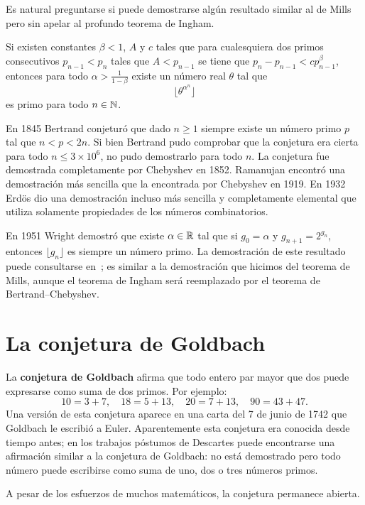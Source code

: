Es natural preguntarse si puede demostrarse algún resultado similar al de Mills
pero sin apelar al profundo teorema de Ingham. 

\begin{exercise}
	Si existen constantes $\beta<1$, $A$ y $c$ tales que para cualesquiera dos primos
	consecutivos $p_{n-1}<p_n$ tales que $A<p_{n-1}$ se tiene que
	$p_n-p_{n-1}<cp_{n-1}^\beta$, entonces para todo $\alpha>\frac{1}{1-\beta}$
	existe un número real $\theta$ tal que 
	\[
		\lfloor \theta^{\alpha^n}\rfloor 
	\]
	es primo para todo $n\in\mathbb{N}$.
\end{exercise}

En 1845 Bertrand conjeturó que dado $n\geq1$ siempre existe un número primo $p$
tal que $n<p<2n$.  Si bien Bertrand pudo comprobar que la conjetura era cierta
para todo $n\leq 3\times 10^6$, no pudo demostrarlo para todo $n$. La conjetura
fue demostrada completamente por Chebyshev en 1852. Ramanujan encontró una
demostración más sencilla que la encontrada por Chebyshev en 1919.  En 1932
Erd\"os dio una demostración incluso más sencilla y completamente elemental que
utiliza solamente propiedades de los números combinatorios. 

En 1951 Wright demostró que existe $\alpha\in\mathbb{R}$ tal que si $g_0=\alpha$ y
$g_{n+1}=2^{g_n}$, entonces $\lfloor g_n\rfloor$ es siempre un número primo. La
demostración de este resultado puede consultarse en~\cite{MR43805}; es similar
a la demostración que hicimos del teorema de Mills, aunque el teorema de Ingham
será reemplazado por el teorema de Bertrand--Chebyshev.


\section*{La conjetura de Goldbach}

La \textbf{conjetura de Goldbach} afirma que todo entero par mayor que dos
puede expresarse como suma de dos primos. Por ejemplo:
\[
	10=3+7,\quad
	18=5+13,\quad
	20=7+13,\quad
	90=43+47.
\]
Una versión de esta conjetura aparece en una carta del 7 de junio de 1742 que
Goldbach le escribió a Euler. Aparentemente esta conjetura era conocida desde
tiempo antes; en los trabajos póstumos de Descartes puede encontrarse una
afirmación similar a la conjetura de Goldbach: no está demostrado pero todo
número puede escribirse como suma de uno, dos o tres números primos.

A pesar de los esfuerzos de muchos matemáticos, la conjetura permanece abierta. 

